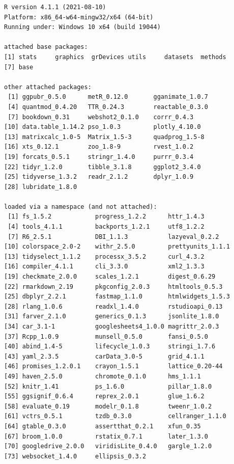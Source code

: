 \documentclass[
  oneside, a4paper, 12pt, openany]{book}
\theoremstyle{definition}
\theoremstyle{definition}
\theoremstyle{definition}
\theoremstyle{definition}
\theoremstyle{remark}
\begin{document}
\begin{verbatim}
R version 4.1.1 (2021-08-10)
Platform: x86_64-w64-mingw32/x64 (64-bit)
Running under: Windows 10 x64 (build 19044)

attached base packages:
[1] stats     graphics  grDevices utils     datasets  methods  
[7] base     

other attached packages:
 [1] ggpubr_0.5.0      metR_0.12.0       gganimate_1.0.7  
 [4] quantmod_0.4.20   TTR_0.24.3        reactable_0.3.0  
 [7] bookdown_0.31     webshot2_0.1.0    corrr_0.4.3      
[10] data.table_1.14.2 pso_1.0.3         plotly_4.10.0    
[13] matrixcalc_1.0-5  Matrix_1.5-3      quadprog_1.5-8   
[16] xts_0.12.1        zoo_1.8-9         rvest_1.0.2      
[19] forcats_0.5.1     stringr_1.4.0     purrr_0.3.4      
[22] tidyr_1.2.0       tibble_3.1.8      ggplot2_3.4.0    
[25] tidyverse_1.3.2   readr_2.1.2       dplyr_1.0.9      
[28] lubridate_1.8.0  

loaded via a namespace (and not attached):
 [1] fs_1.5.2            progress_1.2.2      httr_1.4.3         
 [4] tools_4.1.1         backports_1.2.1     utf8_1.2.2         
 [7] R6_2.5.1            DBI_1.1.3           lazyeval_0.2.2     
[10] colorspace_2.0-2    withr_2.5.0         prettyunits_1.1.1  
[13] tidyselect_1.1.2    processx_3.5.2      curl_4.3.2         
[16] compiler_4.1.1      cli_3.3.0           xml2_1.3.3         
[19] checkmate_2.0.0     scales_1.2.1        digest_0.6.29      
[22] rmarkdown_2.19      pkgconfig_2.0.3     htmltools_0.5.3    
[25] dbplyr_2.2.1        fastmap_1.1.0       htmlwidgets_1.5.3  
[28] rlang_1.0.6         readxl_1.4.0        rstudioapi_0.13    
[31] farver_2.1.0        generics_0.1.3      jsonlite_1.8.0     
[34] car_3.1-1           googlesheets4_1.0.0 magrittr_2.0.3     
[37] Rcpp_1.0.9          munsell_0.5.0       fansi_0.5.0        
[40] abind_1.4-5         lifecycle_1.0.3     stringi_1.7.6      
[43] yaml_2.3.5          carData_3.0-5       grid_4.1.1         
[46] promises_1.2.0.1    crayon_1.5.1        lattice_0.20-44    
[49] haven_2.5.0         chromote_0.1.0      hms_1.1.1          
[52] knitr_1.41          ps_1.6.0            pillar_1.8.0       
[55] ggsignif_0.6.4      reprex_2.0.1        glue_1.6.2         
[58] evaluate_0.19       modelr_0.1.8        tweenr_1.0.2       
[61] vctrs_0.5.1         tzdb_0.3.0          cellranger_1.1.0   
[64] gtable_0.3.0        assertthat_0.2.1    xfun_0.35          
[67] broom_1.0.0         rstatix_0.7.1       later_1.3.0        
[70] googledrive_2.0.0   viridisLite_0.4.0   gargle_1.2.0       
[73] websocket_1.4.0     ellipsis_0.3.2     
\end{verbatim}
\end{document}
